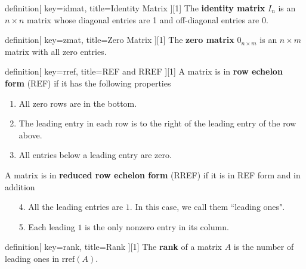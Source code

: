 \begin{SaveConcept}{definition}[
		key=idmat,
		title={Identity Matrix}
	][1]
        The \textbf{identity matrix} $I_n$ is an $n\times n$ matrix whose diagonal entries are 1 and off-diagonal entries are $0$.
\end{SaveConcept}


\begin{SaveConcept}{definition}[
		key=zmat,
		title={Zero Matrix}
	][1]
        The \textbf{zero matrix} $0_{n\times m}$ is an $n\times m$ matrix with all zero entries.
\end{SaveConcept}

 
\begin{SaveConcept}{definition}[
		key=rref,
		title={REF and RREF}
	][1]
    A matrix is in \textbf{row echelon form} (REF) if it has the following properties
	\begin{enumerate}
		\item All zero rows are in the bottom.
		\item The leading entry in each row is to the right of the leading entry of the row above.
		\item All entries below a leading entry are zero.
	\end{enumerate}
	
	A matrix is in \textbf{reduced row echelon form} (RREF) if it is in REF form and in addition
	\begin{enumerate}
		\item [4.]  All the leading entries are $1$. In this case, we call them ``leading ones".
		\item [5.] Each leading $1$ is the only nonzero entry in its column.  
	\end{enumerate}
\end{SaveConcept}


\begin{SaveConcept}{definition}[
		key=rank,
		title={Rank}
	][1]
	The \textbf{rank} of a matrix $A$ is the number of leading ones in  $\mathrm{rref} (A)$.
\end{SaveConcept}


